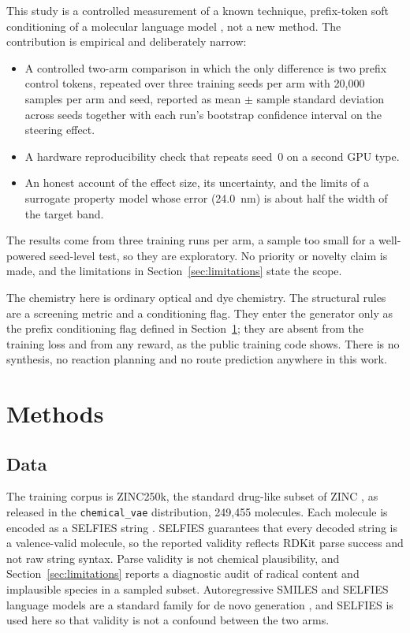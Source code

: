 \documentclass[11pt]{article}
\begin{document}
This study is a controlled measurement of a known technique, prefix-token soft
conditioning of a molecular language model \cite{segler2018generating, kotsias2020steering, keskar2019ctrl},
not a new method. The contribution is empirical and deliberately narrow:
\begin{itemize}
  \item A controlled two-arm comparison in which the only difference is two prefix
  control tokens, repeated over three training seeds per arm with 20{,}000 samples per arm
  and seed, reported as mean $\pm$ sample standard deviation across seeds together with
  each run's bootstrap confidence interval on the steering effect.
  \item A hardware reproducibility check that repeats seed~0 on a second GPU type.
  \item An honest account of the effect size, its uncertainty, and the limits of a
  surrogate property model whose error (24.0~nm) is about half the width of the target
  band.
\end{itemize}

The results come from three training runs per arm, a sample too small for a
well-powered seed-level test, so they are exploratory. No priority or novelty claim is made, and the limitations in
Section~\ref{sec:limitations} state the scope.

The chemistry here is ordinary optical and dye chemistry. The structural rules are a
screening metric and a conditioning flag. They enter the generator only as the prefix
conditioning flag defined in Section~\ref{sec:methods}; they are absent from the training
loss and from any reward, as the public training code shows. There is no synthesis, no
reaction planning and no route prediction anywhere in this work.

\section{Methods}
\label{sec:methods}

\subsection{Data}

The training corpus is ZINC250k, the standard drug-like subset of ZINC
\cite{sterling2015zinc15}, as released in the \texttt{chemical\_vae} distribution,
249{,}455 molecules. Each molecule is encoded as a SELFIES string
\cite{krenn2020selfies}. SELFIES guarantees that every decoded string is a valence-valid
molecule, so the reported validity reflects RDKit \cite{rdkit} parse success and not raw
string syntax. Parse validity is not chemical plausibility, and Section~\ref{sec:limitations}
reports a diagnostic audit of radical content and implausible species in a sampled subset. Autoregressive SMILES and SELFIES language models are a standard family for
de novo generation \cite{blaschke2020reinvent, wang2021mcmg}, and SELFIES is used here so
that validity is not a confound between the two arms.
\end{document}
